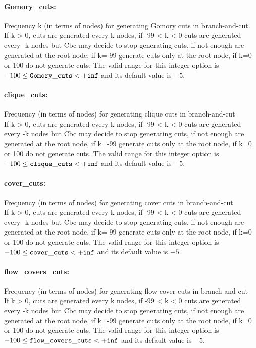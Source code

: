 \paragraph{Gomory\_cuts:} Frequency k (in terms of nodes) for generating Gomory cuts in branch-and-cut. $\;$ \\
 If k > 0, cuts are generated every k nodes, if
-99 < k < 0 cuts are generated every -k nodes but
Cbc may decide to stop generating cuts, if not
enough are generated at the root node, if k=-99
generate cuts only at the root node, if k=0 or
100 do not generate cuts. The valid range for this integer option is
$-100 \le {\tt Gomory\_cuts } <  {\tt +inf}$
and its default value is $-5$.


\paragraph{clique\_cuts:} Frequency (in terms of nodes) for generating clique cuts in branch-and-cut $\;$ \\
 If k > 0, cuts are generated every k nodes, if
-99 < k < 0 cuts are generated every -k nodes but
Cbc may decide to stop generating cuts, if not
enough are generated at the root node, if k=-99
generate cuts only at the root node, if k=0 or
100 do not generate cuts. The valid range for this integer option is
$-100 \le {\tt clique\_cuts } <  {\tt +inf}$
and its default value is $-5$.


\paragraph{cover\_cuts:} Frequency (in terms of nodes) for generating cover cuts in branch-and-cut $\;$ \\
 If k > 0, cuts are generated every k nodes, if
-99 < k < 0 cuts are generated every -k nodes but
Cbc may decide to stop generating cuts, if not
enough are generated at the root node, if k=-99
generate cuts only at the root node, if k=0 or
100 do not generate cuts. The valid range for this integer option is
$-100 \le {\tt cover\_cuts } <  {\tt +inf}$
and its default value is $-5$.


\paragraph{flow\_covers\_cuts:} Frequency (in terms of nodes) for generating flow cover cuts in branch-and-cut $\;$ \\
 If k > 0, cuts are generated every k nodes, if
-99 < k < 0 cuts are generated every -k nodes but
Cbc may decide to stop generating cuts, if not
enough are generated at the root node, if k=-99
generate cuts only at the root node, if k=0 or
100 do not generate cuts. The valid range for this integer option is
$-100 \le {\tt flow\_covers\_cuts } <  {\tt +inf}$
and its default value is $-5$.


